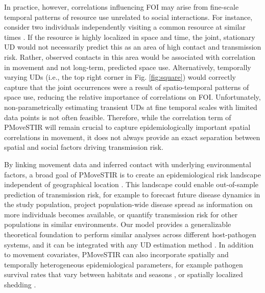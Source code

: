 ﻿\documentclass[11pt]{article}
\begin{document}
In practice, however, correlations influencing FOI may arise from fine-scale temporal patterns of resource use unrelated to social interactions. For instance, consider two individuals independently visiting a common resource at similar times \citep[e.g., a watering hole,][]{VanderWaal2017}. If the resource is highly localized in space and time, the joint, stationary UD would not necessarily predict this as an area of high contact and transmission risk. Rather, observed contacts in this area would be associated with correlation in movement and not long-term, predicted space use.
Alternatively, temporally varying UDs (i.e., the top right corner in Fig. \ref{fig:square}) would correctly capture that the joint occurrences were a result of spatio-temporal patterns of space use, reducing the relative importance of correlations on FOI. Unfortunately, non-parametrically estimating transient UDs at fine temporal scales with limited data points is not often feasible. Therefore, while the correlation term of PMoveSTIR will remain crucial to capture epidemiologically important spatial correlations in movement, it does not always provide an exact separation between spatial and social factors driving transmission risk.

By linking movement data and inferred contact with underlying environmental factors, a broad goal of PMoveSTIR is to create an epidemiological risk landscape independent of geographical location \citep{Merkle2018,Manlove2022}. This landscape could enable out-of-sample prediction of transmission risk, for example to forecast future disease dynamics in the study population, project population-wide disease spread as information on more individuals becomes available, or quantify transmission risk for other populations in similar environments. Our model provides a generalizable theoretical foundation to perform similar analyses across different host-pathogen systems, and it can be integrated with any UD estimation method \citep{Signer2017,Merkle2018,Michelot2020,Potts2023}. In addition to movement covariates, PMoveSTIR can also incorporate spatially and temporally heterogeneous epidemiological parameters, for example pathogen survival rates that vary between habitats and seasons \citep{Daversa2017}, or spatially localized shedding \citep{Weinstein2018a}.

\end{document}
